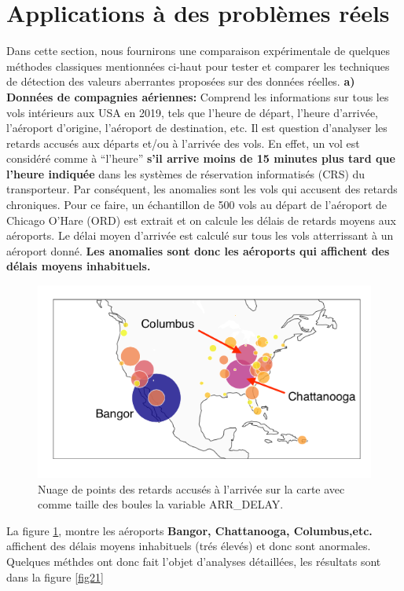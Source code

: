 \newpage

\section{Applications à des problèmes réels}
Dans cette section, nous fournirons une comparaison expérimentale de quelques méthodes classiques  mentionnées ci-haut  pour tester et comparer les techniques de détection des valeurs aberrantes proposées sur des données réelles. \newl
\textbf{a) Données de compagnies aériennes:} Comprend les informations sur tous les vols intérieurs aux USA  en 2019, tels que l'heure de départ, l'heure d'arrivée, l'aéroport d'origine, l'aéroport de destination, etc.  Il est question d’analyser les retards accusés aux  départs et/ou à l’arrivée des vols. En effet, un vol est considéré comme à “l’heure”  \textbf{s’il arrive moins de 15 minutes plus tard que l'heure indiquée} dans les systèmes de réservation informatisés (CRS) du transporteur. Par conséquent, les anomalies sont les vols qui accusent des retards chroniques. Pour ce faire,  un échantillon de 500 vols au départ de l’aéroport de Chicago O’Hare (ORD) est extrait et on calcule les délais de retards moyens aux aéroports. Le délai moyen d’arrivée est calculé sur tous les vols atterrissant à un aéroport donné.\textbf{ Les anomalies sont donc les aéroports qui affichent des délais moyens inhabituels.}
\begin{figure}[H]
    \centering
    \includegraphics[width=.50\textwidth]{ADOA/Images/vols1.png}
    \caption{Nuage de points des retards accusés à l'arrivée sur la carte avec comme taille des boules la variable ARR\_DELAY.}%
    \label{fig20}
\end{figure}
\noindent La figure \ref{fig20}, montre les aéroports \textbf{Bangor, Chattanooga, Columbus,etc.} affichent des délais moyens inhabituels (trés élevés) et donc sont anormales. Quelques méthdes ont donc fait l'objet d'analyses détaillées, les résultats sont dans la figure \ref{fig21}
